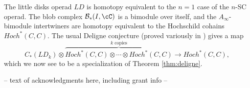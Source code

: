 \documentclass{pnastwo}
\begin{document}
\begin{article}

The little disks operad $LD$ is homotopy equivalent to the $n=1$ case of the $n$-SC operad. The blob complex $\bc_*(I, \cC)$ is a bimodule over itself, and the $A_\infty$-bimodule intertwiners are homotopy equivalent to the Hochschild cohains $Hoch^*(C, C)$. The usual Deligne conjecture (proved variously in \cite{hep-th/9403055, MR1805894, MR2064592, MR1805923}) gives a map
\[
	C_*(LD_k)\otimes \overbrace{Hoch^*(C, C)\otimes\cdots\otimes Hoch^*(C, C)}^{\text{$k$ copies}}
			\to  Hoch^*(C, C),
\]
which we now see to be a specialization of Theorem \ref{thm:deligne}.







\begin{acknowledgments}
-- text of acknowledgments here, including grant info --
\end{acknowledgments}









%


\end{article}
\end{document}

